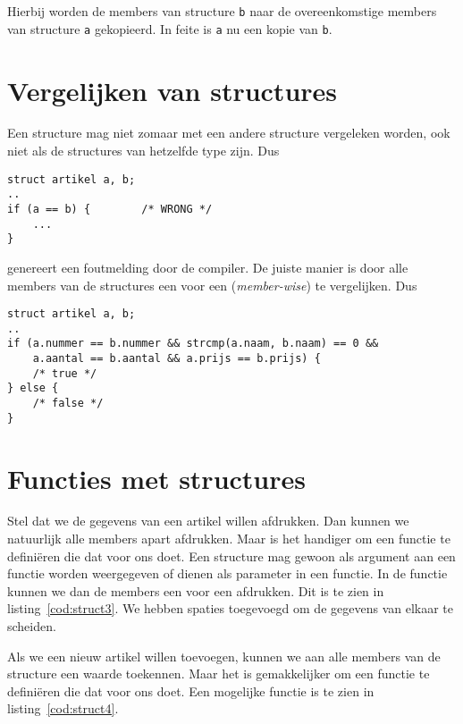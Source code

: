 Hierbij worden de members van structure \texttt{b} naar de overeenkomstige members van structure \texttt{a} gekopieerd. In feite is \texttt{a} nu een kopie van \texttt{b}.


\section{Vergelijken van structures}
Een structure mag niet zomaar met een andere structure vergeleken worden, ook niet als de structures van hetzelfde type zijn. Dus

\begin{lstlisting}[style=lstoneline]
struct artikel a, b;
..
if (a == b) {        /* WRONG */
    ...
}
\end{lstlisting}

genereert een foutmelding door de compiler. De juiste manier is door alle members van de structures een voor een (\textsl{member-wise}) te vergelijken. Dus

\begin{lstlisting}[caption=Vergelijken van twee structures.]
struct artikel a, b;
..
if (a.nummer == b.nummer && strcmp(a.naam, b.naam) == 0 &&
    a.aantal == b.aantal && a.prijs == b.prijs) {
    /* true */
} else {
    /* false */
}
\end{lstlisting}






\section{Functies met structures}
Stel dat we de gegevens van een artikel willen afdrukken. Dan kunnen we natuurlijk alle members apart afdrukken. Maar is het handiger om een functie te definiëren die dat voor ons doet. Een structure mag gewoon als argument aan een functie worden weergegeven of dienen als parameter in een functie. In de functie kunnen we dan de members een voor een afdrukken. Dit is te zien in listing~\ref{cod:struct3}. We hebben spaties toegevoegd om de gegevens van elkaar te scheiden.


Als we een nieuw artikel willen toevoegen, kunnen we aan alle members van de structure een waarde toekennen. Maar het is gemakkelijker om een functie te definiëren die dat voor ons doet. Een mogelijke functie is te zien in listing~\ref{cod:struct4}.

